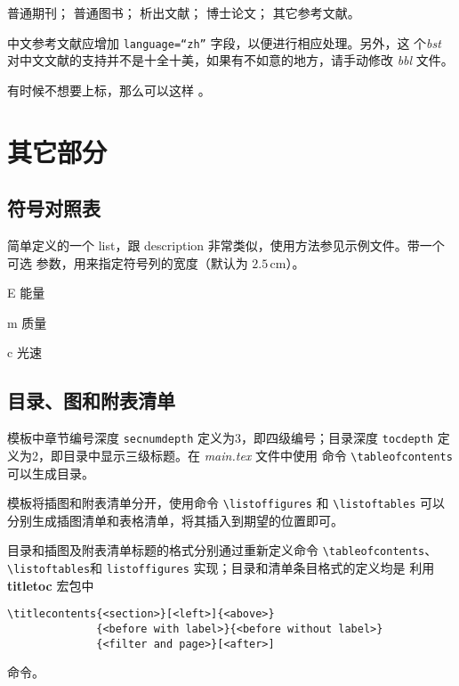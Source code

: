 普通期刊\cite{chen2001, nadkarni1992, hua1973, zhu1973}；
普通图书\cite{zhu1973, huo1981, timoshenko1959}；
析出文献\cite{zhang1991, dupont1974}；
博士论文\cite{ding2001, cairns1965, patent}；
其它参考文献\cite{patent, standard, wang2005}。

中文参考文献应增加 \texttt{language=``zh''} 字段，以便进行相应处理。另外，这
个\emph{bst} 对中文文献的支持并不是十全十美，如果有不如意的地方，请手动修改
\emph{bbl} 文件。

有时候不想要上标，那么可以这样 。

\section{其它部分}
\label{sec:otherparts}

\subsection*{符号对照表}

简单定义的一个 list，跟 description 非常类似，使用方法参见示例文件。带一个可选
参数，用来指定符号列的宽度（默认为 $2.5\,\mathrm{cm}$）。
\begin{code}
\begin{denotation}[1.5cm]
  \item[E] 能量
  \item[m] 质量
  \item[c] 光速
\end{denotation}
\end{code}

\subsection*{目录、图和附表清单}

模板中章节编号深度 \texttt{secnumdepth} 定义为3，即四级编号；目录深度
\texttt{tocdepth} 定义为2，即目录中显示三级标题。在 \emph{main.tex} 文件中使用
命令 \verb|\tableofcontents|可以生成目录。

模板将插图和附表清单分开，使用命令 \verb|\listoffigures| 和 \verb|\listoftables|
可以分别生成插图清单和表格清单，将其插入到期望的位置即可。

目录和插图及附表清单标题的格式分别通过重新定义命令 \verb|\tableofcontents|、
\verb|\listoftables|和 \verb|listoffigures| 实现；目录和清单条目格式的定义均是
利用 \textbf{titletoc} 宏包中\\
\begin{verbatim}
\titlecontents{<section>}[<left>]{<above>}
              {<before with label>}{<before without label>}
              {<filter and page>}[<after>]
\end{verbatim}
命令。

